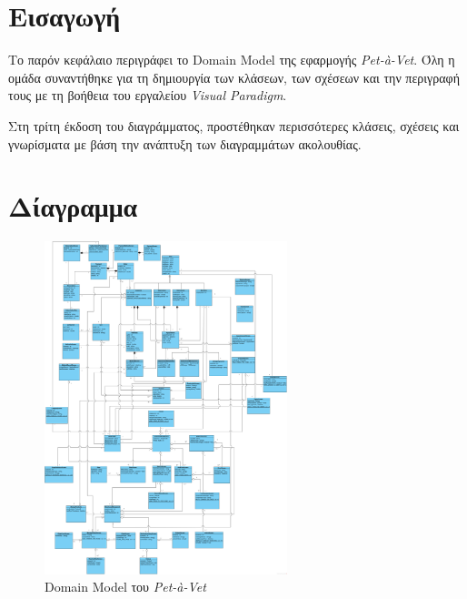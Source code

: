 \documentclass[12pt,a4paper,twoside]{book}
\begin{document}
\section{Εισαγωγή}
Το παρόν κεφάλαιο περιγράφει το Domain Model της εφαρμογής \textit{Pet-à-Vet}. Όλη η ομάδα συναντήθηκε για τη δημιουργία των κλάσεων, των σχέσεων και την περιγραφή τους με τη βοήθεια του εργαλείου \textit{Visual Paradigm}. %

Στη τρίτη έκδοση του διαγράμματος, προστέθηκαν περισσότερες κλάσεις, σχέσεις και γνωρίσματα με βάση την ανάπτυξη των διαγραμμάτων ακολουθίας. %

\section{Δίαγραμμα}
\begin{figure}[H]
    \centering
    \includegraphics[width=0.63\textwidth]{Resources/Domain-model-v0.2.png}
    \caption{Domain Model του \textit{Pet-à-Vet}}\label{fig:domain_model}
\end{figure}
\end{document}

